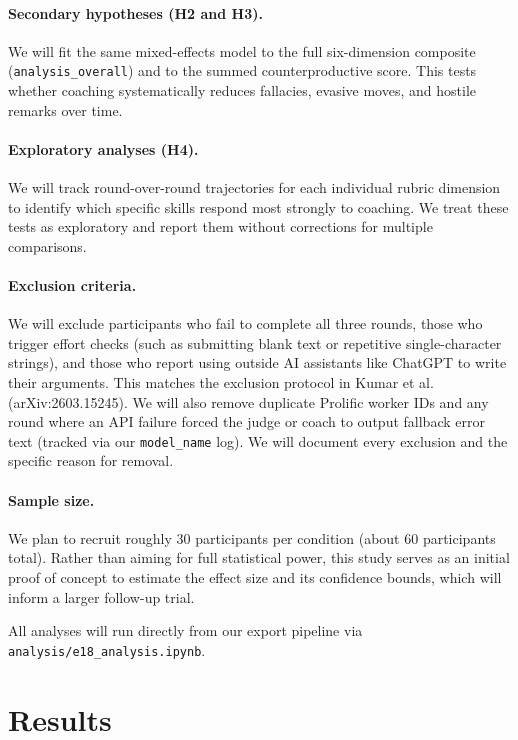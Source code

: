 \documentclass[11pt]{article}
\begin{document}
\paragraph{Secondary hypotheses (H2 and H3).} We will fit the same mixed-effects model to the full six-dimension composite (\texttt{analysis\_overall}) and to the summed counterproductive score. This tests whether coaching systematically reduces fallacies, evasive moves, and hostile remarks over time.

\paragraph{Exploratory analyses (H4).} We will track round-over-round trajectories for each individual rubric dimension to identify which specific skills respond most strongly to coaching. We treat these tests as exploratory and report them without corrections for multiple comparisons.

\paragraph{Exclusion criteria.} We will exclude participants who fail to complete all three rounds, those who trigger effort checks (such as submitting blank text or repetitive single-character strings), and those who report using outside AI assistants like ChatGPT to write their arguments. This matches the exclusion protocol in Kumar et al. (arXiv:2603.15245). We will also remove duplicate Prolific worker IDs and any round where an API failure forced the judge or coach to output fallback error text (tracked via our \texttt{model\_name} log). We will document every exclusion and the specific reason for removal.

\paragraph{Sample size.} We plan to recruit roughly 30 participants per condition (about 60 participants total). Rather than aiming for full statistical power, this study serves as an initial proof of concept to estimate the effect size and its confidence bounds, which will inform a larger follow-up trial.

All analyses will run directly from our export pipeline via \texttt{analysis/e18\_analysis.ipynb}.

\section{Results}
\label{sec:results}
\end{document}
